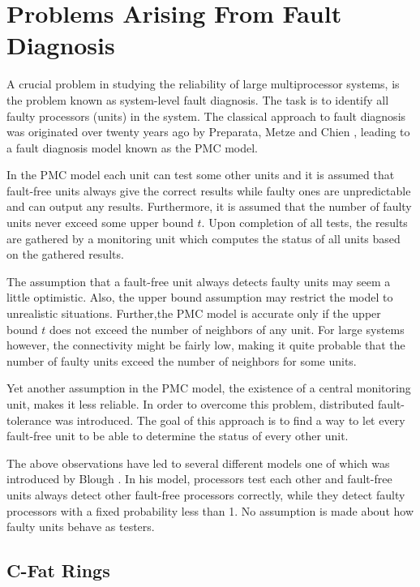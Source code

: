 \section{Problems Arising From Fault Diagnosis}

A crucial problem in studying the reliability of large multiprocessor systems, is
the problem known as system-level fault diagnosis. The task
is to identify all faulty processors (units) in the system. The
classical approach to fault diagnosis was originated over twenty years
ago by Preparata, Metze and Chien \cite{PMC}, leading to a fault
diagnosis model known as the PMC model. 

In the PMC model each unit can test some other units and it is
assumed that fault-free units always give the correct results while
faulty ones are unpredictable and can output any results. Furthermore,
it is assumed that the number of faulty units never exceed some upper
bound $t$. Upon completion of all tests, the results are gathered by a
monitoring unit which computes the status of all units based on the
gathered results. 

The assumption that a fault-free unit always detects
faulty units may seem a little optimistic. Also, the upper bound
assumption may restrict the model to unrealistic situations. Further,the PMC
model is accurate only if the upper bound $t$ does not exceed the
number of neighbors of any unit. For large systems however, the
connectivity might be fairly low, making it quite probable that the
number of faulty units exceed the number of neighbors for some units.

Yet another assumption in the PMC model, the existence of a central
monitoring unit, makes it less reliable. In order to overcome this
problem, distributed fault-tolerance was introduced. The goal of this
approach is to find a way to let every fault-free unit to be able to
determine the status of every other unit.

The above observations have led to several different models one of
which was introduced by Blough \cite{Blo}. In his model, processors
test each other and fault-free units always detect other fault-free
processors correctly, while they detect faulty processors with a fixed
probability less than 1. No assumption is made about how faulty units behave as
testers.

\subsection{C-Fat Rings}

